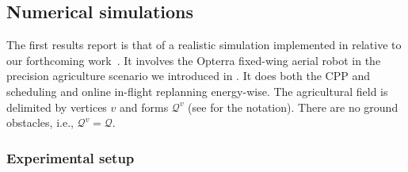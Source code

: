 \subsection{Numerical simulations}
\label{sec:res-num-simu}

The first results report is that of a realistic simulation implemented in \matlab relative to our forthcoming work~\citep{seewald202Xenergy}. It involves the Opterra fixed-wing aerial robot in the precision agriculture scenario we introduced in . It does both the CPP and scheduling and online in-flight replanning energy-wise. The agricultural field is delimited by vertices $v$ and forms $\mathcal{Q}^v$ (see  for the notation). There are no ground obstacles, i.e., $\mathcal{Q}^v=\mathcal{Q}$.

\subsubsection*{Experimental setup}

